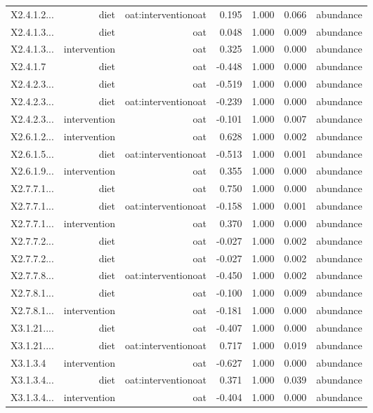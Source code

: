 \documentclass[
]{article}
\begin{document}
\begin{longtable}[t]{lrrrrrr}
X2.4.1.2... & diet & oat:interventionoat & 0.195 & 1.000 & 0.066 & abundance\\
X2.4.1.3... & diet & oat & 0.048 & 1.000 & 0.009 & abundance\\
X2.4.1.3... & intervention & oat & 0.325 & 1.000 & 0.000 & abundance\\
X2.4.1.7 & diet & oat & -0.448 & 1.000 & 0.000 & abundance\\
\addlinespace
X2.4.2.3... & diet & oat & -0.519 & 1.000 & 0.000 & abundance\\
X2.4.2.3... & diet & oat:interventionoat & -0.239 & 1.000 & 0.000 & abundance\\
X2.4.2.3... & intervention & oat & -0.101 & 1.000 & 0.007 & abundance\\
X2.6.1.2... & intervention & oat & 0.628 & 1.000 & 0.002 & abundance\\
X2.6.1.5... & diet & oat:interventionoat & -0.513 & 1.000 & 0.001 & abundance\\
\addlinespace
X2.6.1.9... & intervention & oat & 0.355 & 1.000 & 0.000 & abundance\\
X2.7.7.1... & diet & oat & 0.750 & 1.000 & 0.000 & abundance\\
X2.7.7.1... & diet & oat:interventionoat & -0.158 & 1.000 & 0.001 & abundance\\
X2.7.7.1... & intervention & oat & 0.370 & 1.000 & 0.000 & abundance\\
X2.7.7.2... & diet & oat & -0.027 & 1.000 & 0.002 & \vphantom{1} abundance\\
\addlinespace
X2.7.7.2... & diet & oat & -0.027 & 1.000 & 0.002 & abundance\\
X2.7.7.8... & diet & oat:interventionoat & -0.450 & 1.000 & 0.002 & abundance\\
X2.7.8.1... & diet & oat & -0.100 & 1.000 & 0.009 & abundance\\
X2.7.8.1... & intervention & oat & -0.181 & 1.000 & 0.000 & abundance\\
X3.1.21.... & diet & oat & -0.407 & 1.000 & 0.000 & abundance\\
\addlinespace
X3.1.21.... & diet & oat:interventionoat & 0.717 & 1.000 & 0.019 & abundance\\
X3.1.3.4 & intervention & oat & -0.627 & 1.000 & 0.000 & abundance\\
X3.1.3.4... & diet & oat:interventionoat & 0.371 & 1.000 & 0.039 & abundance\\
X3.1.3.4... & intervention & oat & -0.404 & 1.000 & 0.000 & abundance\\

\end{longtable}
\end{document}
